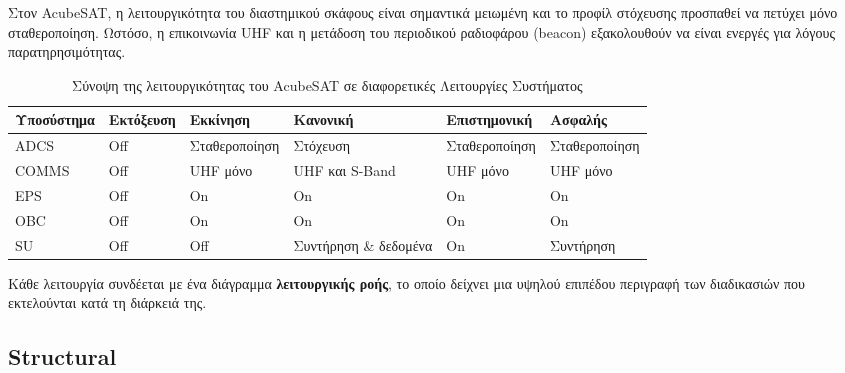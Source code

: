 \documentclass[a4paper,nobib]{tufte-book}
\begin{document}
\begin{itemize}
	Στον AcubeSAT, η λειτουργικότητα του διαστημικού σκάφους είναι σημαντικά μειωμένη και το προφίλ στόχευσης προσπαθεί να πετύχει μόνο σταθεροποίηση. Ωστόσο, η επικοινωνία \ac{UHF} και η μετάδοση του περιοδικού ραδιοφάρου (beacon) εξακολουθούν να είναι ενεργές για λόγους παρατηρησιμότητας.
\end{itemize}

\begin{table}[h]
	\centering
	\caption{Σύνοψη της λειτουργικότητας του AcubeSAT σε διαφορετικές Λειτουργίες Συστήματος}
	\label{tab:acubesatmodes}
	\begin{tabular}{@{}llllll@{}}
		\toprule
		Υποσύστημα    & Εκτόξευση & Εκκίνηση & Κανονική                 & Επιστημονική        & Ασφαλής             \\ \midrule
		\acs{ADCS}  & \color{off} Off    & Σταθεροποίηση     & \color{on} Στόχευση                & Σταθεροποίηση     & Σταθεροποίηση       \\
		\acs{COMMS} & \color{off} Off    & \acs{UHF} μόνο & \color{on} \acs{UHF} και S-Band    & \acs{UHF} μόνο & \acs{UHF} μόνο   \\
		\acs{EPS}   & \color{off} Off    & \color{on} On             & \color{on} On                      & \color{on} On             & \color{on} On               \\
		\acs{OBC}   & \color{off} Off    & \color{on} On             & \color{on} On                      & \color{on} On             & \color{on} On               \\
		\acs{SU}    & \color{off} Off    & \color{off} Off            & Συντήρηση \& δεδομένα & \color{on} On             & Συντήρηση \\ \bottomrule
	\end{tabular}
	\vspace{1em}
\end{table}


Κάθε λειτουργία συνδέεται με ένα διάγραμμα \textbf{λειτουργικής ροής}, το οποίο δείχνει μια υψηλού επιπέδου περιγραφή των διαδικασιών που εκτελούνται κατά τη διάρκειά της. \autocite{acubesat_functional_2021}



\subsection{Structural}
\end{document}
